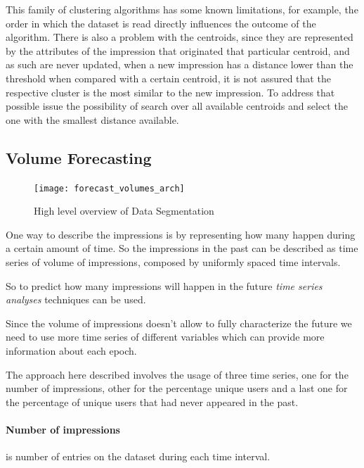 This family of clustering algorithms has some known limitations, for example, the
order in which the dataset is read directly influences the outcome of the
algorithm. There is also a problem with the centroids, since they are represented
by the attributes of the impression that originated that particular centroid,
and as such are never updated,
when a new impression has a distance lower than the threshold when compared with
a certain centroid, it is not assured that the respective cluster is the most
similar to the new impression. To address that possible issue the possibility of
search over all available centroids and select the one with the smallest distance
available.

\subsection{Volume Forecasting}\label{subsec:volume_forecast}

\begin{figure}[h] \begin{center} \leavevmode
\texttt{[image: forecast\_volumes\_arch]} \caption{ High level overview
of Data Segmentation} \label{fig:forecast_volumes_arch} \end{center} \end{figure}

One way to describe the impressions is by representing how many happen during a
certain amount of time. So the impressions in the past can be described as time
series of volume of impressions, composed by uniformly spaced time intervals. 

So to predict how many impressions will happen in the future \emph{time series
analyses} techniques can be used. 

Since the volume of impressions doesn't allow to fully characterize the future
we need to use more time series of different variables which can provide more
 information about each epoch.

The approach here described involves the usage of three time series, one for the
number of impressions, other for the percentage unique users and a last one for
the percentage of unique users that had never appeared in the past.

\paragraph{Number of impressions}
is number of entries on the dataset during each time interval.

